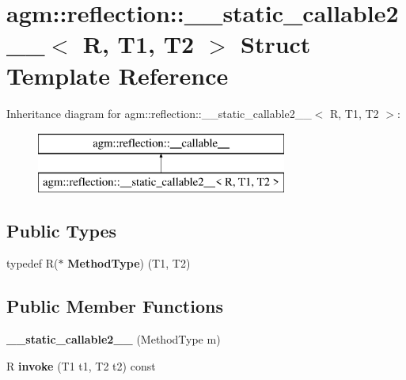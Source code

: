 \hypertarget{structagm_1_1reflection_1_1____static__callable2____}{}\section{agm\+:\+:reflection\+:\+:\+\_\+\+\_\+static\+\_\+callable2\+\_\+\+\_\+$<$ R, T1, T2 $>$ Struct Template Reference}
\label{structagm_1_1reflection_1_1____static__callable2____}
Inheritance diagram for agm\+:\+:reflection\+:\+:\+\_\+\+\_\+static\+\_\+callable2\+\_\+\+\_\+$<$ R, T1, T2 $>$\+:\begin{figure}[H]
\begin{center}
\leavevmode
\includegraphics[height=2.000000cm]{structagm_1_1reflection_1_1____static__callable2____}
\end{center}
\end{figure}
\subsection*{Public Types}
\begin{DoxyCompactItemize}
\item 
typedef R($\ast$ {\bfseries Method\+Type}) (T1, T2)\hypertarget{structagm_1_1reflection_1_1____static__callable2_____afa219dcbfc73860ebe8dc64358e52805}{}\label{structagm_1_1reflection_1_1____static__callable2_____afa219dcbfc73860ebe8dc64358e52805}

\end{DoxyCompactItemize}
\subsection*{Public Member Functions}
\begin{DoxyCompactItemize}
\item 
{\bfseries \+\_\+\+\_\+static\+\_\+callable2\+\_\+\+\_\+} (Method\+Type m)\hypertarget{structagm_1_1reflection_1_1____static__callable2_____a854b79788ae3adc9cce2537e9f528b26}{}\label{structagm_1_1reflection_1_1____static__callable2_____a854b79788ae3adc9cce2537e9f528b26}

\item 
R {\bfseries invoke} (T1 t1, T2 t2) const \hypertarget{structagm_1_1reflection_1_1____static__callable2_____a462b491106648dd7ecd56df3b2a408d5}{}\label{structagm_1_1reflection_1_1____static__callable2_____a462b491106648dd7ecd56df3b2a408d5}

\end{DoxyCompactItemize}
